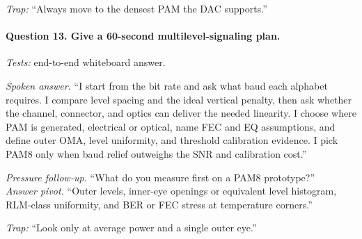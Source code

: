 \textit{Trap:} ``Always move to the densest PAM the DAC supports.''

\paragraph{Question 13. Give a 60-second multilevel-signaling plan.}
\textit{Tests:} end-to-end whiteboard answer.

\textit{Spoken answer.}
``I start from the bit rate and ask what baud each alphabet requires. I compare
level spacing and the ideal vertical penalty, then ask whether the channel,
connector, and optics can deliver the needed linearity. I choose where PAM is
generated, electrical or optical, name FEC and EQ assumptions, and define outer
OMA, level uniformity, and threshold calibration evidence. I pick PAM8 only when
baud relief outweighs the SNR and calibration cost.''

\textit{Pressure follow-up.} ``What do you measure first on a PAM8 prototype?''\\
\textit{Answer pivot.} ``Outer levels, inner-eye openings or equivalent level
histogram, RLM-class uniformity, and BER or FEC stress at temperature corners.''

\textit{Trap:} ``Look only at average power and a single outer eye.''

